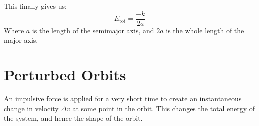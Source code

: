 This finally gives us:
\[
    E_\text{tot} = \frac{-k}{2a}
\]
Where $a$ is the length of the semimajor axis, and $2a$ is the whole length of the major axis.

\section{Perturbed Orbits}
An impulsive force is applied for a very short time to create an instantaneous change in velocity $\Delta v$ at some point in the orbit. This changes the total energy of the system, and hence the shape of the orbit.







